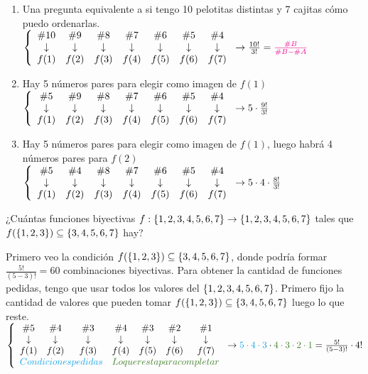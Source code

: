 \begin{enumerate}[label=\roman*)]
	\item Una pregunta equivalente a si tengo 10 pelotitas distintas y 7 cajitas cómo puedo ordenarlas.
	      $\llave{c c c c c c c}{
			      \#10 & \#9 & \#8 & \#7 & \#6 & \#5 & \#4 \\
			      \downarrow &\downarrow & \downarrow &\downarrow &\downarrow &\downarrow &\downarrow\\
			      f(1) & f(2) &f(3) &f(4) &f(5) &f(6) &f(7)
		      }
		      \to\frac{10!}{3!} = \magenta{\frac{\#B}{\#B - \#A} }
              $

	\item Hay 5 números pares para elegir como imagen de $f(1)$\\
	      $\llave{c c c c c c c}{
			      \#5 & \#9 & \#8 & \#7 & \#6 & \#5 & \#4 \\
			      \downarrow &\downarrow & \downarrow &\downarrow &\downarrow &\downarrow &\downarrow\\
			      f(1) & f(2) &f(3) &f(4) &f(5) &f(6) &f(7)
		      }
		      \to 5 \cdot \frac{9!}{3!}$

	\item Hay 5 números pares para elegir como imagen de $f(1)$, luego habrá 4 números pares para $f(2)$\\
	      $\llave{c c c c c c c}{
			      \#5 & \#4 & \#8 & \#7 & \#6 & \#5 & \#4 \\
			      \downarrow &\downarrow & \downarrow &\downarrow &\downarrow &\downarrow &\downarrow\\
			      f(1) & f(2) &f(3) &f(4) &f(5) &f(6) &f(7)
		      }
		      \to 5 \cdot 4 \cdot \frac{8!}{3!}$
\end{enumerate}

\ejercicio
¿Cuántas funciones biyectivas $f: \set{1,2,3,4,5,6,7} \to \set{1,2,3,4,5,6,7}$ tales que $f(\set{1,2,3}) \subseteq \set{3,4,5,6,7}$ hay?

\separadorCorto

Primero veo la condición  $f(\set{1,2,3}) \subseteq \set{3,4,5,6,7}$, donde podría formar $\frac{5!}{(5-3)!} = 60$ combinaciones biyectivas.
Para obtener la cantidad de funciones pedidas, tengo que usar todos los valores del $\set{1,2,3,4,5,6,7}$. Primero fijo la cantidad de
valores que pueden tomar $f(\set{1,2,3}) \subseteq \set{3,4,5,6,7}$ luego lo que reste.
\\
$\llave{c c c c c c c}{
		\#5 & \#4 & \#3 & \#4 & \#3 & \#2 & \#1 \\
		\downarrow & \downarrow & \downarrow &\downarrow &\downarrow &\downarrow &\downarrow\\
		f(1) & f(2) &f(3) &f(4) &f(5) &f(6) &f(7)\\
		\multicolumn{3}{c}{\blue{Condiciones pedidas}} & \multicolumn{4}{c}{\green{Lo que resta para completar}}
	}
	\to \blue{5 \cdot 4 \cdot 3} \cdot \green{4 \cdot 3 \cdot 2 \cdot 1} = \frac{5!}{(5-3)!} \cdot 4!$

